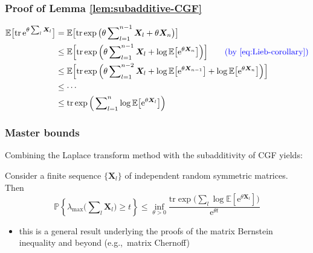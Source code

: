 \documentclass[compress,
mathserif,wide,%
]{beamer}
\begin{document}
\begin{frame}
\frametitle{Proof of Lemma \ref{lem:subadditive-CGF}}  


\begin{align*}
\mathbb{E}\big[\mathrm{tr}\,\mathrm{e}^{\theta\sum_{l}\bm{X}_{l}}\big] & =\mathbb{E}\big[\mathrm{tr}\exp\big(\theta\sum\nolimits _{l=1}^{n-1}\bm{X}_{l}+\theta\bm{X}_{n}\big)\big]\\
	& \leq\mathbb{E}\Big[\mathrm{tr}\exp\Big(\theta\sum\nolimits _{l=1}^{n-1}\bm{X}_{l}+\log\mathbb{E}\big[ \mathrm{e}^{\theta\bm{X}_{n}} \big]\Big)\Big] \qquad \textcolor{blue}{ (\text{by }\eqref{eq:Lieb-corollary})}\\
 	& \leq\mathbb{E}\Big[\mathrm{tr}\exp\Big(\theta\sum\nolimits _{l=1}^{n-2}\bm{X}_{l}+\log\mathbb{E}\big[ \mathrm{e}^{\theta\bm{X}_{n-1}} \big]+\log\mathbb{E}\big[\mathrm{e}^{\theta\bm{X}_{n}}\big]\Big)\Big]\\
 	& \leq\cdots\\
 	& \leq\mathrm{tr}\exp\Big(\sum\nolimits _{l=1}^{n}\log\mathbb{E}\big[\mathrm{e}^{\theta\bm{X}_{l}}\big]\Big)
\end{align*}


\end{frame}



\begin{frame}
\frametitle{Master bounds}  


Combining the Laplace transform method with the subadditivity of CGF yields:

\bigskip

\begin{theorem}
	\label{thm:master-bounds}
	Consider a finite sequence $\{\bm{X}_l\}$ of independent random symmetric matrices. Then 
	\vspace{-0.5em}
	\[
		\mathbb{P}\left\{ \lambda_{\max}\big(\sum\nolimits _{l}\bm{X}_{l}\big)\geq t\right\} \leq\inf_{\theta>0}\frac{\mathrm{tr}\exp\big(\sum\nolimits _{l}\log\mathbb{E}[\mathrm{e}^{\theta\bm{X}_{l}}]\big)}{\mathrm{e}^{\theta t}}
	\]
\end{theorem}

\begin{itemize}
	\item this is a general result underlying the proofs of the matrix Bernstein inequality and beyond (e.g.,~matrix Chernoff)
\end{itemize}


\end{frame}
\end{document}

